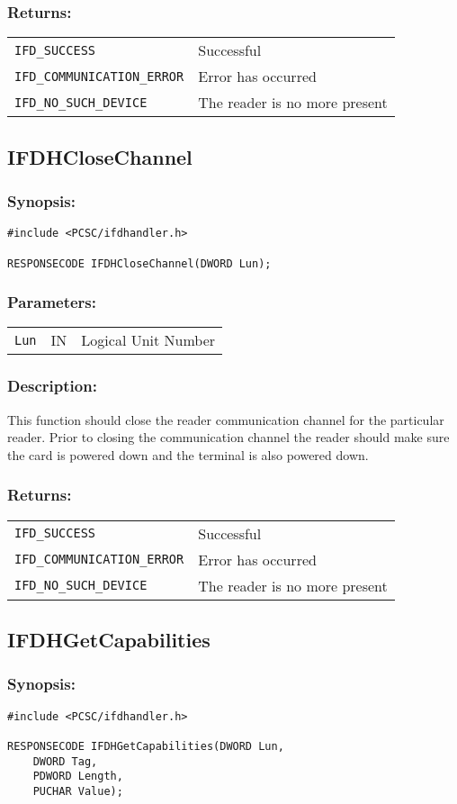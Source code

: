 \documentclass[a4paper,12pt]{article}
\newcommand{\synopsis}{\subsubsection{Synopsis:}}
\newcommand{\parameters}{\subsubsection{Parameters:}}
\newcommand{\desc}{\subsubsection{Description:}}
\newcommand{\returns}{\subsubsection{Returns:}}
\begin{document}
\returns

\begin{tabular}{ll}
\texttt{IFD\_SUCCESS} & Successful\\
\texttt{IFD\_COMMUNICATION\_ERROR} & Error has occurred\\
\texttt{IFD\_NO\_SUCH\_DEVICE} & The reader is no more present\\
\end{tabular}


\subsection{IFDHCloseChannel}

\synopsis
\begin{verbatim}
#include <PCSC/ifdhandler.h>

RESPONSECODE IFDHCloseChannel(DWORD Lun);
\end{verbatim}

\parameters

\begin{tabular}{lll}
\texttt{Lun} & IN & Logical Unit Number \\
\end{tabular}

\desc

This function should close the reader communication channel for the
particular reader. Prior to closing the communication channel the reader
should make sure the card is powered down and the terminal is also
powered down.

\returns

\begin{tabular}{ll}
\texttt{IFD\_SUCCESS} & Successful\\
\texttt{IFD\_COMMUNICATION\_ERROR} & Error has occurred\\
\texttt{IFD\_NO\_SUCH\_DEVICE} & The reader is no more present\\
\end{tabular}


\subsection{IFDHGetCapabilities}

\synopsis
\begin{verbatim}
#include <PCSC/ifdhandler.h>

RESPONSECODE IFDHGetCapabilities(DWORD Lun,
    DWORD Tag,
    PDWORD Length,
    PUCHAR Value);
\end{verbatim}
\end{document}
